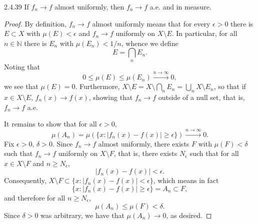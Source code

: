 \documentclass[11pt]{article}
\begin{document}
\begin{problem}{2.4.39}
	If \( f_n \rightarrow f \) almost uniformly, then \( f_n \rightarrow f \) a.e. and in measure.
\end{problem}
\begin{proof}
	By definition, \( f_n \rightarrow f \) almost uniformly means that for every \(\epsilon > 0\) there is \( E \subset X \) with \(\mu(E) < \epsilon\) and \( f_n \rightarrow f \) uniformly on \( X \setminus E \).
	In particular, for all \( n \in \mathbb{N} \) there is \( E_n \) with \(\mu(E_n) < 1/n\), whence we define
	\begin{equation}
		\label{eq:1}
		E = \bigcap_n E_n.
	\end{equation}
	Noting that
	\begin{equation}
		\label{eq:4}
		0 \leq \mu(E) \leq \mu(E_n) \xrightarrow{n \rightarrow \infty} 0,
	\end{equation}
	we see that \( \mu(E) = 0. \)
	Furthermore, \( X \setminus E = X \setminus \bigcap_n E_n = \bigcup_n X \setminus E_{n} \), so that if \( x \in X \setminus E \), \( f_n(x) \rightarrow f(x) \), showing that \( f_{n} \rightarrow f \) outside of a null set, that is, \( f_n \rightarrow f \) a.e.

	It remains to show that for all \( \epsilon > 0 \),
	\begin{equation}
		\label{eq:5}
		\mu(A_n) = \mu(\{ x: |f_n(x) - f(x)| \geq \epsilon \}) \xrightarrow{n \rightarrow \infty} 0.
	\end{equation}
	Fix \(\epsilon > 0\), \(\delta > 0\).
	Since \( f_n \rightarrow f \) almost uniformly, there exists \( F \) with \( \mu(F) < \delta \) such that \( f_n \rightarrow f \) uniformly on \( X \setminus F \), that is, there exists \( N_{\epsilon} \) such that for all \( x \in X \setminus F \) and \( n \geq N_{\epsilon} \),
	\begin{equation}
		\label{eq:14}
		|f_n(x)-f(x)| < \epsilon.
	\end{equation}
	Consequently, \( X \setminus F \subset \{x: |f_n(x) - f(x)| < \epsilon\} \), which means in fact
	\begin{equation}
		\label{eq:15}
		\{x: |f_n(x) - f(x)| \geq \epsilon\} = A_n \subset F,
	\end{equation}
	and therefore for all \( n \geq N_{\epsilon} \),
	\begin{equation}
		\label{eq:16}
		\mu(A_n) \leq \mu(F) < \delta.
	\end{equation}
	Since \(\delta>0\) was arbitrary, we have that \( \mu(A_n) \rightarrow 0 \), as desired.
\end{proof}
\end{document}
